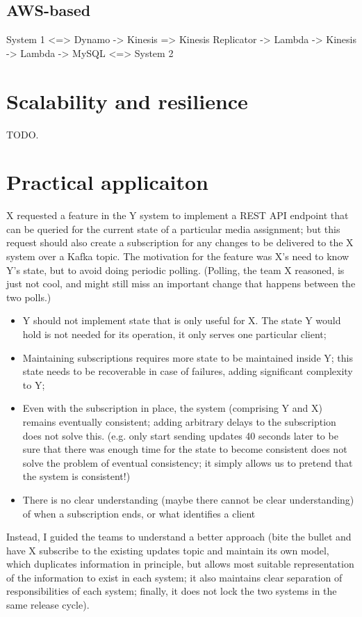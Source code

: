 \documentclass[10 pt, twocolumn]{article}
\begin{document}
\subsection{AWS-based}

System 1 <=> Dynamo 
          -> Kinesis => Kinesis Replicator -> Lambda -> Kinesis -> Lambda -> MySQL <=> System 2

\section{Scalability and resilience}
TODO.

\section{Practical applicaiton}
X requested a feature in the Y system to implement a REST API endpoint that can be queried for the current state of a particular media assignment; but this request should also create a subscription for any changes to be delivered to the X system over a Kafka topic. The motivation for the feature was X’s need to know Y’s state, but to avoid doing periodic polling. (Polling, the team X reasoned, is just not cool, and might still miss an important change that happens between the two polls.)
\begin{itemize}
  \item Y should not implement state that is only useful for X. The state Y would hold is not needed for its operation, it only serves one particular client;
  \item Maintaining subscriptions requires more state to be maintained inside Y; this state needs to be recoverable in case of failures, adding significant complexity to Y;
  \item  Even with the subscription in place, the system (comprising Y and X) remains eventually consistent; adding arbitrary delays to the subscription does not solve this. (e.g. only start sending updates 40 seconds later to be sure that there was enough time for the state to become consistent does not solve the problem of eventual consistency; it simply allows us to pretend that the system is consistent!)
  \item There is no clear understanding (maybe there cannot be clear understanding) of when a subscription ends, or what identifies a client
\end{itemize}
Instead, I guided the teams to understand a better approach (bite the bullet and have X subscribe to the existing updates topic and maintain its own model, which duplicates information in principle, but allows most suitable representation of the information to exist in each system; it also maintains clear separation of responsibilities of each system; finally, it does not lock the two systems in the same release cycle).


\printbibliography
\end{document}
